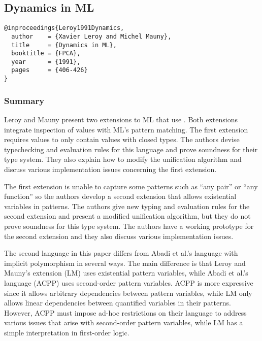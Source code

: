 \documentclass[letterpaper]{llncs}
\begin{document}
\subsection*{Dynamics in ML}%
\begin{verbatim}
@inproceedings{Leroy1991Dynamics,
  author    = {Xavier Leroy and Michel Mauny},
  title     = {Dynamics in ML},
  booktitle = {FPCA},
  year      = {1991},
  pages     = {406-426}
}
\end{verbatim}

\newcommand{\mlcode}[1]{$\mathtt{#1}$}


\subsubsection*{Summary}
Leroy and Mauny present two extensions to ML that use \Dynamic. Both extensions integrate inspection of \Dynamic values with ML's pattern matching. The first extension requires \Dynamic values to only contain values with closed types. The authors devise typechecking and evaluation rules for this language and prove soundness for their type system. They also explain how to modify the unification algorithm and discuss various implementation issues concerning the first extension.

The first extension is unable to capture some patterns such as ``any pair'' or ``any function'' so the authors develop a second extension that allows existential variables in patterns. The authors give new typing and evaluation rules for the second extension and present a modified unification algorithm, but they do not prove soundness for this type system. The authors have a working prototype for the second extension and they also discuss various implementation issues.

The second language in this paper differs from Abadi et al.'s language with implicit polymorphism in several ways. The main difference is that Leroy and Mauny's extension (LM) uses existential pattern variables, while Abadi et al.'s language (ACPP) uses second-order pattern variables. ACPP is more expressive since it allows arbitrary dependencies between pattern variables, while LM only allows linear dependencies between quantified variables in their patterns. However, ACPP must impose ad-hoc restrictions on their language to address various issues that arise with second-order pattern variables, while LM has a simple interpretation in first-order logic.
\end{document}
